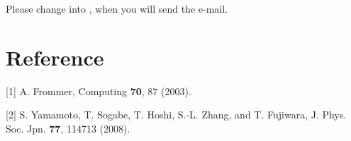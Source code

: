 \documentclass[letterpaper,10pt,dvipdfmx,openany]{sphinxmanual}
\begin{document}
Please change  into , when you will send the e-mail.


\chapter{Reference}
\label{komega_ref_en:ref}\label{komega_ref_en::doc}\label{komega_ref_en:reference}
{[}1{]} A. Frommer, Computing \textbf{70}, 87 (2003).

{[}2{]} S. Yamamoto, T. Sogabe, T. Hoshi, S.-L. Zhang, and T. Fujiwara, J. Phys. Soc. Jpn. \textbf{77}, 114713 (2008).



\renewcommand{\indexname}{Index}
\printindex
\end{document}
